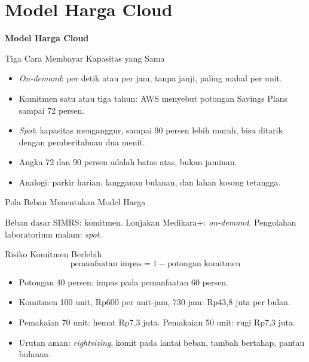 \documentclass[aspectratio=169, table, 12pt]{beamer}
\begin{document}
\section{Model Harga Cloud}

\begin{frame}{\hfill}
  \centering
  \Huge{\textbf{Model Harga Cloud}}
\end{frame}

\begin{frame}{{\Large Tiga Cara Membayar Kapasitas yang Sama}}
  \vspace{10pt}
  \begin{itemize}
    \item \textit{On-demand}: per detik atau per jam, tanpa janji, paling mahal
          per unit.
    \item Komitmen satu atau tiga tahun: AWS menyebut potongan Savings Plans
          sampai 72 persen.
    \item \textit{Spot}: kapasitas menganggur, sampai 90 persen lebih murah,
          bisa ditarik dengan pemberitahuan dua menit.
    \item Angka 72 dan 90 persen adalah batas atas, bukan jaminan.
    \item Analogi: parkir harian, langganan bulanan, dan lahan kosong tetangga.
  \end{itemize}
\end{frame}

\begin{frame}{{\Large Pola Beban Menentukan Model Harga}}
  \centering

  \vspace{4pt}
  {\small Beban dasar SIMRS: komitmen. Lonjakan Medikara+: \textit{on-demand}.
  Pengolahan laboratorium malam: \textit{spot}.}
\end{frame}

\begin{frame}{{\Large Risiko Komitmen Berlebih}}
  \vspace{6pt}
  \[
    \text{pemanfaatan impas} = 1 - \text{potongan komitmen}
  \]
  \begin{itemize}
    \item Potongan 40 persen: impas pada pemanfaatan 60 persen.
    \item Komitmen 100 unit, Rp600 per unit-jam, 730 jam: Rp43,8 juta per bulan.
    \item Pemakaian 70 unit: hemat Rp7,3 juta. Pemakaian 50 unit: rugi
          Rp7,3 juta.
    \item Urutan aman: \textit{rightsizing}, komit pada lantai beban, tambah
          bertahap, pantau bulanan.
  \end{itemize}
\end{frame}
\end{document}
